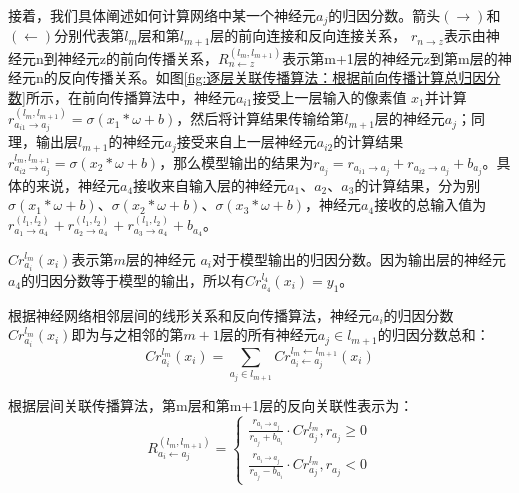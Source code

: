接着，我们具体阐述如何计算网络中某一个神经元$a_{j}$的归因分数。箭头$(\rightarrow)$和$(\leftarrow)$分别代表第$l_{m}$层和第$l_{m+1}$层的前向连接和反向连接关系， $r_{n \rightarrow z}$表示由神经元n到神经元z的前向传播关系，$R_{n \leftarrow z}^{(l_{m}, l_{m+1})}$表示第m+1层的神经元z到第m层的神经元n的反向传播关系。如图\ref{fig:逐层关联传播算法：根据前向传播计算总归因分数}所示，在前向传播算法中，神经元$a_{i1}$接受上一层输入的像素值 $x_{1}$并计算$r_{a_{i1} \rightarrow a_{j}}^{(l_{m}, l_{m+1})}=\sigma\left(x_{1} * \omega+b\right)$，然后将计算结果传输给第$l_{m+1}$层的神经元$a_{j}$；同理，输出层$l_{m+1}$的神经元$a_{j}$接受来自上一层神经元$a_{i2}$的计算结果$r_{a_{i2} \rightarrow a_{j}}^{l_{m}, l_{m+1}}=\sigma\left(x_{2} * \omega+b\right)$，那么模型输出的结果为$r_{a_{j}}=r_{a_{i1} \rightarrow a_{j}}+r_{a_{i2} \rightarrow a_{j}}+b_{a_{j}}$。具体的来说，神经元$a_{4}$接收来自输入层的神经元$a_{1}$、$a_{2}$、$a_{3}$的计算结果，分为别$\sigma\left(x_{1} * \omega+b\right)$、$\sigma\left(x_{2} * \omega+b\right)$、$\sigma\left(x_{3} * \omega+b\right)$，神经元$a_{4}$接收的总输入值为$r_{a_{1} \rightarrow a_{4}}^{(l_{1}, l_{2})}+r_{a_{2} \rightarrow a_{4}}^{(l_{1}, l_{2})}+r_{a_{3} \rightarrow a_{4}}^{(l_{1}, l_{2})}+b_{a_{4}}$。

$C r_{a_{i}}^{l_{m}}\left(x_{i}\right)$表示第$m$层的神经元 $a_{i}$对于模型输出的归因分数。因为输出层的神经元$a_{4}$的归因分数等于模型的输出，所以有$C r_{a_{4}}^{l_{4}}\left(x_{i}\right)=y_{1}$。

根据神经网络相邻层间的线形关系和反向传播算法，神经元$a_{i}$的归因分数$Cr_{a_{i}}^{l_{m}}\left(x_{i}\right)$即为与之相邻的第$m+1$层的所有神经元${a_{j}\in l_{m+1}}$的归因分数总和：
$$
Cr_{a_{i}}^{l_{m}}\left(x_{i}\right)=\sum_{a_{j} \in l_{m+1}} Cr_{a_{i} \leftarrow a_{j}}^{l_{m} \leftarrow l_{m+1}}\left(x_{i}\right)
$$

根据层间关联传播算法，第m层和第m+1层的反向关联性表示为：
$$
R_{a_{i} \leftarrow a_{j}}^{(l_{m}, l_{m+1})}=\left\{\begin{array}{l}\frac{r_{a_{i}  \rightarrow a_{j} }}{r_{a_{j}}+b_{a_{i}}} \cdot C r_{a_{j}}^{l_{m} }, r_{a_{j}} \geq 0 \\ \frac{r_{a_{i} \rightarrow a_{j} }}{r_{a_{j} }-b_{a_{i}}} \cdot C r_{a_{j}}^{l_{m} }, r_{a_{j}}<0\end{array}\right.
$$


